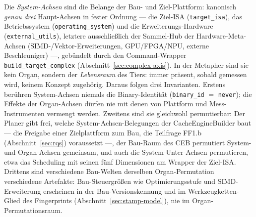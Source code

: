 \begin{nurkurz}
Die \emph{System-Achsen} sind die Belange der Bau- und Ziel-Plattform: kanonisch \emph{genau drei} Haupt-Achsen
in fester Ordnung --- die Ziel-ISA (\texttt{target\_isa}), das Betriebssystem (\texttt{operating\_system}) und
die Erweiterungs-Hardware (\texttt{external\_utils}), letztere ausschließlich der Sammel-Hub der
Hardware-Meta-Achsen (SIMD-/Vektor-Erweiterungen, GPU/FPGA/NPU, externe Beschleuniger) ---, gebündelt durch den
Command-Wrapper \texttt{build\_target\_complex} (Abschnitt~\ref{sec:complex-axis}). In der Metapher sind sie kein
Organ, sondern der \emph{Lebensraum} des Tiers: immer präsent, sobald gemessen wird, keinem Konzept zugehörig.
Daraus folgen drei Invarianten. Erstens berühren System-Achsen niemals die Binary-Identität (\texttt{binary\_id}
$=$ \texttt{never}); die Effekte der Organ-Achsen dürfen nie mit denen von Plattform und Mess-Instrumenten
vermengt werden. Zweitens sind sie gleichwohl permutierbar: Der Planer gibt frei, welche
System-Achsen-Belegungen der CacheEngineBuilder baut --- die Freigabe einer Zielplattform zum Bau, die
Teilfrage FF1.b (Abschnitt~\ref{sec:rqs}) voraussetzt ---, der Bau-Raum des CEB permutiert System- und
Organ-Achsen gemeinsam, und auch die System-Unter-Achsen permutieren, etwa das Scheduling mit seinen fünf
Dimensionen am Wrapper der Ziel-ISA\@. Drittens sind verschiedene Bau-Welten derselben Organ-Permutation
verschiedene Artefakte: Bau-Steuergrößen wie Optimierungsstufe und SIMD-Erweiterung erscheinen in der
Bau-Versionskennung und im Werkzeugketten-Glied des Fingerprints (Abschnitt~\ref{sec:stamp-model}), nie im
Organ-Permutationsraum.
\end{nurkurz}

